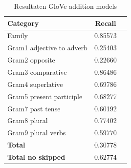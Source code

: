 \begin{table}[h!]
{        \begin{tabular}{| l | c | r}
        	\hline
        	\textbf{Category} &    \textbf{Recall}\\ \hline
        	Family 				& 0.85573 \\
        	Gram1 adjective to adverb 	& 0.25403 \\
        	Gram2 opposite 			& 0.22660 \\
        	Gram3 comparative 		& 0.86486 \\
        	Gram4 superlative 		& 0.69786 \\
        	Gram5 present participle	& 0.68277 \\
        	Gram7 past tense 		& 0.60192 \\
        	Gram8 plural 			& 0.77402 \\
        	Gram9 plural verbs 		& 0.59770 \\
        	\textbf{Total}			& 0.30778 \\
        	\textbf{Total no skipped}	& 0.62774 \\ \hline
        \end{tabular}
}
\hfill
{}
\caption[Resultaten GloVe addition models]
        {Resultaten GloVe addition models}
    \label{glove-addition}
\end{table}
    
